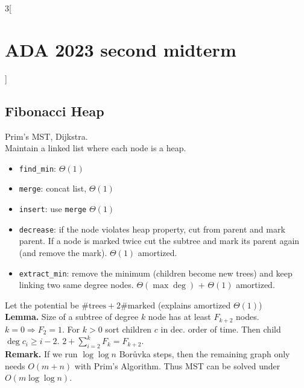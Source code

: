\documentclass[10pt,a4paper]{report}
\begin{document}
\begin{multicols}{3}[\section*{ADA 2023 second midterm}]
\subsection*{Fibonacci Heap}
Prim's MST, Dijkstra.\\
Maintain a linked list where each node is a heap.
\begin{itemize} 
  \item \texttt{find\_min}: $\Theta(1)$
  \item \texttt{merge}: concat list, $\Theta(1)$
  \item \texttt{insert}: use \texttt{merge} $\Theta(1)$
  \item \texttt{decrease}: if the node violates heap property, cut from parent and mark parent. If a node is marked twice cut the subtree and mark its parent again (and remove the mark). $\Theta(1)$ amortized.
  \item \texttt{extract\_min}: remove the minimum (children become new trees) and keep linking two same degree nodes. $\Theta(\max \deg)$ + $\Theta(1)$ amortized.
\end{itemize}
Let the potential be $\text{\#trees} + 2 \text{\#marked}$ (explains amortized $\Theta(1)$) \\
\textbf{Lemma.} Size of a subtree of degree $k$ node has at least $F_{k+2}$ nodes. \\
$k = 0 \Rightarrow F_2 = 1$. For $k > 0$ sort children $c$ in dec. order of time. Then child $\deg c_i \geq i - 2$. $2 + \sum_{i=2}^{k} F_k = F_{k+2}$. \\
\textbf{Remark.} If we run $\log \log n$ Borůvka steps, then the remaining graph only needs $O(m + n)$ with Prim's Algorithm. Thus MST can be solved under $O(m \log \log n)$. %
\end{multicols}
\end{document}
